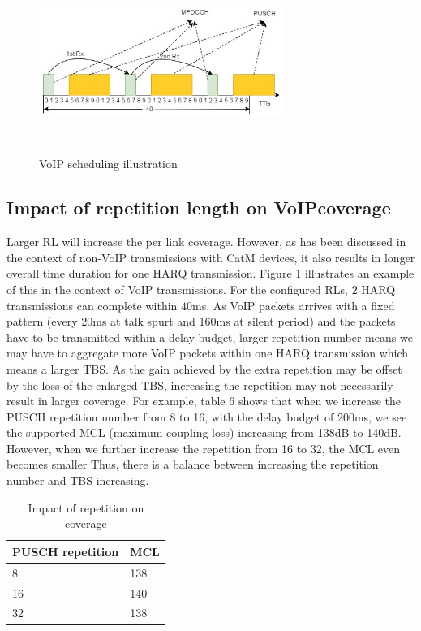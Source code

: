 \documentclass[conference,compsoc]{IEEEtran}
\begin{document}
\begin{figure}[htbp]
\centerline{\includegraphics[height=60mm,width=80mm]{voip.png}}
\caption{VoIP scheduling illustration}
\label{fig_voip}
\end{figure}


\subsection{Impact of repetition length on VoIPcoverage}
Larger RL will increase the per link coverage. However, as has been discussed in the context of non-VoIP transmissions with CatM devices, it also results in longer overall time duration for one HARQ transmission. Figure \ref{fig_voip} illustrates an example of this in the context of VoIP transmissions. For the configured RLs, $2$ HARQ transmissions can complete within $40$ms. As VoIP packets arrives with a fixed pattern (every 20ms at talk spurt and 160ms at silent period) and the packets have to be transmitted within a delay budget, larger repetition number means we may have to aggregate more VoIP packets within one HARQ transmission which means a larger TBS. As the gain achieved by the extra repetition may be offset by the loss of the enlarged TBS, increasing the repetition may not necessarily result in larger coverage. For example, table 6 shows that when we increase the PUSCH repetition number from 8 to 16, with the delay budget of 200ms, we see the supported MCL (maximum coupling loss) increasing from 138dB to 140dB. However, when we further increase the repetition from 16 to 32, the MCL even becomes smaller   Thus, there is a balance between increasing the repetition number and TBS increasing.
\begin{table}
    \centering
    \begin{tabular}{|l|l|}
    \hline
        {\bf PUSCH repetition} & {\bf MCL} \\ 
        \hline
    \hline
        8	& 138 \\
        \hline
        16	& 140 \\
        \hline
        32	& 138 \\
    \hline
\end{tabular}
    \label{table_assump}
    \caption{Impact of repetition on coverage}
\end{table}
\end{document}
